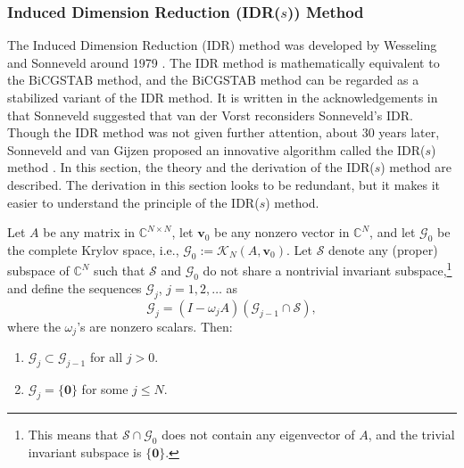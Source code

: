 \subsubsection{{Induced Dimension Reduction (IDR($s$)) Method}}\label{subsec:idr-method}
{The Induced Dimension Reduction (IDR) method was developed by Wesseling and Sonneveld around 1979 . The IDR method is mathematically equivalent to the BiCGSTAB method, and the BiCGSTAB method can be regarded as a stabilized variant of the IDR method. It is written in the acknowledgements in  that Sonneveld suggested that van der Vorst reconsiders Sonneveld's IDR.}
{Though the IDR method was not given further attention, about 30 years later, Sonneveld and van Gijzen proposed an innovative algorithm called the IDR($s$) method . In this section, the theory and the derivation of the IDR($s$) method are described. The derivation in this section looks to be redundant, but it makes it easier to understand the principle of the IDR($s$) method.}
\par{}
\begin{Theorem}\label{thm:idr-dimension-reduction}
{Let $A$ be any matrix in $\mathbb C^{N\times N}$, let $\bm v_0$ be any nonzero vector in $\mathbb C^N$, and let $\mathcal G_0$ be the complete Krylov space, i.e., $\mathcal G_0:=\mathcal K_N(A,\bm v_0)$. Let $\mathcal S$ denote any (proper) subspace of $\mathbb C^N$ such that $\mathcal S$ and $\mathcal G_0$ do not share a nontrivial invariant subspace,}\footnote{{This means that $\mathcal S\cap\mathcal G_0$ does not contain any eigenvector of $A$, and the trivial invariant subspace is $\{\bm0\}$.}}
{and define the sequences $\mathcal G_j$, $j=1,2,\ldots$ as}
\begin{equation}\label{eq:idr-subspace-recurrence}\mathcal G_j=(I-\omega_jA)(\mathcal G_{j-1}\cap\mathcal S),\end{equation}
{where the $\omega_j$'s are nonzero scalars. Then:}
\begin{enumerate}[label=(\arabic*)]
\item $\mathcal G_j\subset\mathcal G_{j-1}$ {for all $j>0$.}
\item $\mathcal G_j=\{\bm0\}$ {for some $j\le N$.}
\end{enumerate}\end{Theorem}

